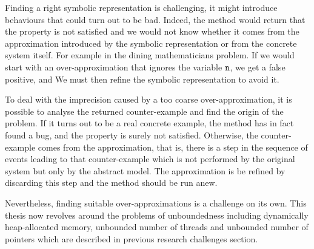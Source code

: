 Finding a right symbolic representation 
is challenging, it might introduce
behaviours that could turn out to be bad.  Indeed, the method would
return that the property is not satisfied and we would not know
whether it comes from the approximation introduced by the symbolic representation or from the concrete system
itself.
For example in the dining mathematicians problem. If we would start with an over-approximation that ignores the variable $\tt n$, we get a false
  positive, and We must then refine
    the symbolic representation to
  avoid it.

To deal with the imprecision caused by a too coarse
over-approximation, it is possible to analyse the returned
counter-example and find the origin of the problem. If it turns out to
be a real concrete example, the method has in fact found a bug, and
the property is surely not satisfied. Otherwise, the counter-example
comes from the approximation, that is, there is a step in the sequence
of events leading to that counter-example which is not performed by
the original system but only by the abstract model. The approximation
is be refined by discarding this step and the method should be run
anew.

Nevertheless, finding suitable over-approximations is a challenge on
its own. %
This thesis now revolves around the problems of unboundedness including dynamically heap-allocated memory, unbounded number of threads and unbounded number of pointers which are described in previous research challenges section.
